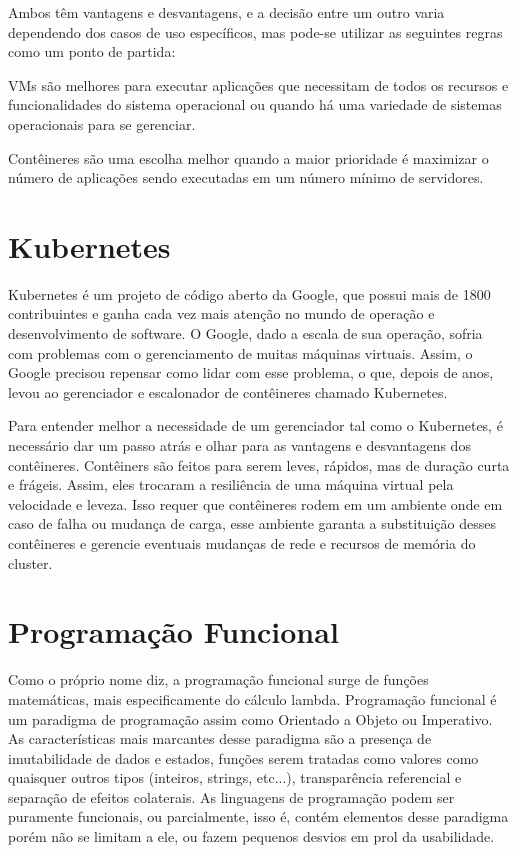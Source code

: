 \documentclass[]{politex}
\begin{document}
	Ambos têm vantagens e desvantagens, e a decisão entre um outro varia dependendo dos casos de uso específicos, mas pode-se utilizar as seguintes regras como um ponto de partida:
	
	VMs são melhores para executar aplicações que necessitam de todos os recursos e funcionalidades do sistema operacional ou quando há uma variedade de sistemas operacionais para se gerenciar.
	
	Contêineres são uma escolha melhor quando a maior prioridade é maximizar o número de aplicações sendo executadas em um número mínimo de servidores.
	
	\section{Kubernetes}
	Kubernetes é um projeto de código aberto da Google, que possui mais de 1800 contribuintes e ganha cada vez mais atenção no mundo de operação e desenvolvimento de software. 
	O Google, dado a escala de sua operação, sofria com problemas com o gerenciamento de muitas máquinas virtuais. 
	Assim, o Google precisou repensar como lidar com esse problema, o que, depois de anos, levou ao gerenciador e escalonador de contêineres chamado Kubernetes.

	Para entender melhor a necessidade de um gerenciador tal como o Kubernetes, é necessário dar um passo atrás e olhar para as vantagens e desvantagens dos contêineres.
	Contêiners são feitos para serem leves, rápidos, mas de duração curta e frágeis.
	Assim, eles trocaram a resiliência de uma máquina virtual pela velocidade e leveza. Isso requer que contêineres rodem em um ambiente onde em caso de falha ou mudança de carga, esse ambiente garanta a substituição desses contêineres e gerencie eventuais mudanças de rede e recursos de memória do cluster.
	
	\section{Programação Funcional}
	
	Como o próprio nome diz, a programação funcional surge de funções matemáticas, mais especificamente do cálculo lambda. Programação funcional é um paradigma de programação assim como Orientado a Objeto ou Imperativo. As características mais marcantes desse paradigma são a presença de imutabilidade de dados e estados, funções serem tratadas como valores como quaisquer outros tipos (inteiros, strings, etc...), transparência referencial e separação de efeitos colaterais.
	As linguagens de programação podem ser puramente funcionais, ou parcialmente, isso é, contém elementos desse paradigma porém não se limitam a ele, ou fazem pequenos desvios em prol da usabilidade.
	
\end{document}
